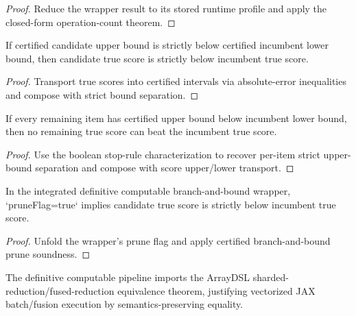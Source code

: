 \begin{proof}
Reduce the wrapper result to its stored runtime profile and apply the closed-form operation-count theorem.
\end{proof}

\begin{theorem}
\label{thm:definitive-branch-bound-prune-sound}
If certified candidate upper bound is strictly below certified incumbent lower bound, then candidate true score is strictly below incumbent true score.
\end{theorem}

\begin{proof}
Transport true scores into certified intervals via absolute-error inequalities and compose with strict bound separation.
\end{proof}

\begin{theorem}
\label{thm:definitive-adaptive-stop-sound}
If every remaining item has certified upper bound below incumbent lower bound, then no remaining true score can beat the incumbent true score.
\end{theorem}

\begin{proof}
Use the boolean stop-rule characterization to recover per-item strict upper-bound separation and compose with score upper/lower transport.
\end{proof}

\begin{theorem}
\label{thm:definitive-pipeline-branch-bound-prune-sound}
In the integrated definitive computable branch-and-bound wrapper, `pruneFlag=true` implies candidate true score is strictly below incumbent true score.
\end{theorem}

\begin{proof}
Unfold the wrapper's prune flag and apply certified branch-and-bound prune soundness.
\end{proof}

\begin{theorem}
\label{thm:definitive-batch-fusion-justified}
The definitive computable pipeline imports the ArrayDSL sharded-reduction/fused-reduction equivalence theorem, justifying vectorized JAX batch/fusion execution by semantics-preserving equality.
\end{theorem}

